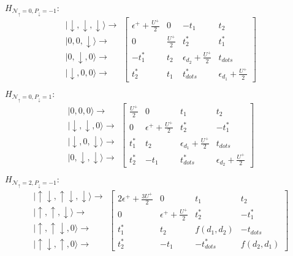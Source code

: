 $H_{\mathcal{N}_{\uparrow}=0,P_{\downarrow}=-1}:$
\[
\begin{array}{c}
\vert\downarrow,\downarrow,\downarrow\rangle\rightarrow\\
\vert0,0,\downarrow\rangle\rightarrow\\
\vert0,\downarrow,0\rangle\rightarrow\\
\vert\downarrow,0,0\rangle\rightarrow
\end{array}\left[\begin{array}{cccc}
\epsilon^{+}+\frac{U^{+}}{2} & 0 & -t_{1} & t_{2}\\
0 & \frac{U^{+}}{2} & t_{2}^{*} & t_{1}^{*}\\
-t_{1}^{*} & t_{2} & \epsilon_{d_{2}}+\frac{U^{+}}{2} & t_{dots}\\
t_{2}^{*} & t_{1} & t^{*}_{dots} & \epsilon_{d_{1}}+\frac{U^{+}}{2}
\end{array}\right]
\]


$H_{\mathcal{N}_{\uparrow}=0,P_{\downarrow}=1}:$
\[
\begin{array}{c}
\vert0,0,0\rangle\rightarrow\\
\vert\downarrow,\downarrow,0\rangle\rightarrow\\
\vert\downarrow,0,\downarrow\rangle\rightarrow\\
\vert0,\downarrow,\downarrow\rangle\rightarrow
\end{array}\left[\begin{array}{cccc}
\frac{U^{+}}{2} & 0 & t_{1} & t_{2}\\
0 & \epsilon^{+}+\frac{U^{+}}{2} & t_{2}^{*} & -t_{1}^{*}\\
t_{1}^{*} & t_{2} & \epsilon_{d_{1}}+\frac{U^{+}}{2} & t_{dots}\\
t_{2}^{*} & -t_{1} & t^{*}_{dots} & \epsilon_{d_{2}}+\frac{U^{+}}{2}
\end{array}\right]
\]


$H_{\mathcal{N}_{\uparrow}=2,P_{\downarrow}=-1}:$
\[
\begin{array}{c}
\vert\uparrow\!\downarrow,\uparrow\!\downarrow,\downarrow\rangle\rightarrow\\
\vert\uparrow,\uparrow,\downarrow\rangle\rightarrow\\
\vert\uparrow,\uparrow\!\downarrow,0\rangle\rightarrow\\
\vert\uparrow\!\downarrow,\uparrow,0\rangle\rightarrow
\end{array}\left[\begin{array}{cccc}
2\epsilon^{+}+\frac{3U^{+}}{2} & 0 & t_{1} & t_{2}\\
0 & \epsilon^{+}+\frac{U^{+}}{2} & t_{2}^{*} & -t_{1}^{*}\\
t_{1}^{*} & t_{2} & f(d_{1},d_{2}) & -t_{dots}\\
t_{2}^{*} & -t_{1} & -t^{*}_{dots} & f(d_{2},d_{1})
\end{array}\right]
\]


